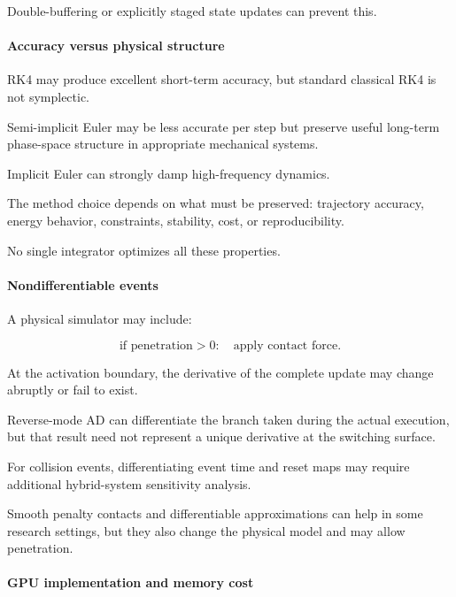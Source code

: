 Double-buffering or explicitly staged state updates can prevent this.

\paragraph{Accuracy versus physical structure}\label{02-foundations-ii-ch022-accuracy-versus-physical-structure}

RK4 may produce excellent short-term accuracy, but standard classical RK4 is not symplectic.

Semi-implicit Euler may be less accurate per step but preserve useful long-term phase-space structure in appropriate mechanical systems.

Implicit Euler can strongly damp high-frequency dynamics.

The method choice depends on what must be preserved: trajectory accuracy, energy behavior, constraints, stability, cost, or reproducibility.

No single integrator optimizes all these properties.

\paragraph{Nondifferentiable events}\label{02-foundations-ii-ch022-nondifferentiable-events}

A physical simulator may include:

\[
\text{if penetration}>0: \quad\text{apply contact force}.
\]

At the activation boundary, the derivative of the complete update may change abruptly or fail to exist.

Reverse-mode AD can differentiate the branch taken during the actual execution, but that result need not represent a unique derivative at the switching surface.

For collision events, differentiating event time and reset maps may require additional hybrid-system sensitivity analysis.

Smooth penalty contacts and differentiable approximations can help in some research settings, but they also change the physical model and may allow penetration.

\paragraph{GPU implementation and memory cost}\label{02-foundations-ii-ch022-gpu-implementation-and-memory-cost}

